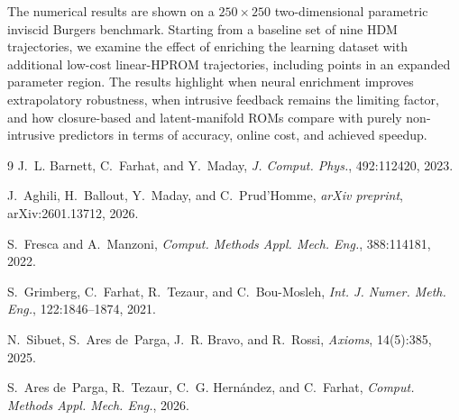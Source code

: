 \documentclass[a4paper,11pt]{article}
\begin{document}
The numerical results are shown on a $250\times250$ two-dimensional parametric inviscid Burgers benchmark.  Starting from a baseline set of nine HDM trajectories, we examine the effect of enriching the learning dataset with additional low-cost linear-HPROM trajectories, including points in an expanded parameter region.  The results highlight when neural enrichment improves extrapolatory robustness, when intrusive feedback remains the limiting factor, and how closure-based and latent-manifold ROMs compare with purely non-intrusive predictors in terms of accuracy, online cost, and achieved speedup.

\begin{thebibliography}{9}
J.~L. Barnett, C.~Farhat, and Y.~Maday, \emph{J. Comput. Phys.}, 492:112420, 2023.

J.~Aghili, H.~Ballout, Y.~Maday, and C.~Prud'Homme, \emph{arXiv preprint}, arXiv:2601.13712, 2026.

S.~Fresca and A.~Manzoni, \emph{Comput. Methods Appl. Mech. Eng.}, 388:114181, 2022.

S.~Grimberg, C.~Farhat, R.~Tezaur, and C.~Bou-Mosleh, \emph{Int. J. Numer. Meth. Eng.}, 122:1846--1874, 2021.

N.~Sibuet, S.~Ares de~Parga, J.~R. Bravo, and R.~Rossi, \emph{Axioms}, 14(5):385, 2025.

S.~Ares de~Parga, R.~Tezaur, C.~G. Hern\'{a}ndez, and C.~Farhat, \emph{Comput. Methods Appl. Mech. Eng.}, 2026.
\end{thebibliography}
\end{document}
